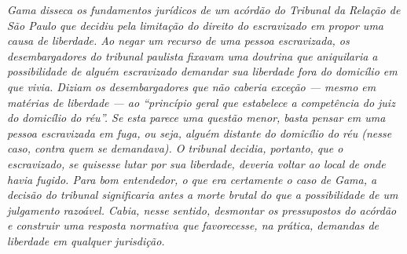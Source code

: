 \begin{flushleft}
{\footnotesize\itshape
Gama disseca os fundamentos
jurídicos de um acórdão do Tribunal da Relação de São Paulo que decidiu
pela limitação do direito do escravizado em propor uma causa de
liberdade. Ao negar um recurso de uma pessoa escravizada, os
desembargadores do tribunal paulista fixavam uma doutrina que
aniquilaria a possibilidade de alguém escravizado demandar sua liberdade
fora do domicílio em que vivia. Diziam os desembargadores que não
caberia exceção --- mesmo em matérias de liberdade --- ao ``princípio geral
que estabelece a competência do juiz do domicílio do réu''. Se esta
parece uma questão menor, basta pensar em uma pessoa escravizada em
fuga, ou seja, alguém distante do domicílio do réu (nesse caso, contra
quem se demandava). O tribunal decidia, portanto, que o escravizado, se
quisesse lutar por sua liberdade, deveria voltar ao local de onde havia
fugido. Para bom entendedor, o que era certamente o caso de Gama, a
decisão do tribunal significaria antes a morte brutal do que a
possibilidade de um julgamento razoável. Cabia, nesse sentido, desmontar
os pressupostos do acórdão e construir uma resposta normativa que
favorecesse, na prática, demandas de liberdade em qualquer jurisdição. }
\end{flushleft}


